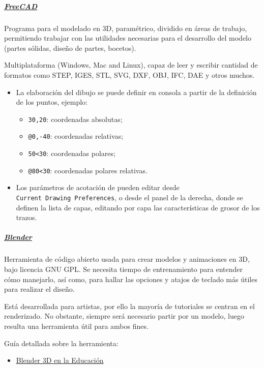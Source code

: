 \subparagraph{\texorpdfstring{
\href{http://www.freecadweb.org/}{FreeCAD}}{FreeCAD}}\label{header-n109}

Programa para el modelado en 3D, paramétrico, dividido en áreas de
trabajo, permitiendo trabajar con las utilidades necesarias para el
desarrollo del modelo (partes sólidas, diseño de partes, bocetos).

Multiplataforma (Windows, Mac and Linux), capaz de leer y escribir
cantidad de formatos como STEP, IGES, STL, SVG, DXF, OBJ, IFC, DAE y
otros muchos.

\begin{itemize}
\item
  La elaboración del dibujo se puede definir en consola a partir de la
  definición de los puntos, ejemplo:

  \begin{itemize}
  \item
    \texttt{30,20}: coordenadas absolutas;
    \item
      \texttt{@0,-40}: coordenadas relativas;
    \item
      \texttt{50\textless{}30}: coordenadas polares;
    \item
      \texttt{@80\textless{}30}: coordenadas polares relativas.
   \end{itemize}

 \item
  Los parámetros de acotación de pueden editar desde
  \texttt{Current\ Drawing\ Preferences}, o desde el panel de la
  derecha, donde se definen la lista de capas, editando por capa las
  características de grosor de los trazos.
 \end{itemize}

\subparagraph{\texorpdfstring{
\href{https://www.blender.org/}{Blender}}{Blender}}\label{header-n137}

Herramienta de código abierto usada para crear modelos y animaciones en
3D, bajo licencia GNU GPL. Se necesita tiempo de entrenamiento para
entender cómo manejarlo, así como, para hallar las opciones y atajos de
teclado más útiles para realizar el diseño.

Está desarrollada para artistas, por ello la mayoría de tutoriales se
centran en el renderizado. No obstante, siempre será necesario partir
por un modelo, luego resulta una herramienta útil para ambos fines.

Guía detallada sobre la herramienta:

\begin{itemize}
\item
  \href{http://blender-fish.blogspot.com.es/2014/04/manual-de-blender-en-espanol-modulo-1.html}{Blender
  3D en la Educación}
\end{itemize}

